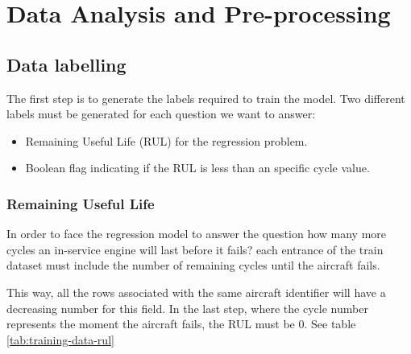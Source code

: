 
\chapter{Data Analysis and Pre-processing} %

\label{Chapter3}


\section{Data labelling}

The first step is to generate the labels required to train the model.
Two different labels must be generated for each question we want to answer:

\begin{itemize}
    \item Remaining Useful Life (RUL) for the regression problem.
    \item Boolean flag indicating if the RUL is less than an specific cycle value.
\end{itemize}

\subsection{Remaining Useful Life}

In order to face the regression model to answer the question how many more cycles an in-service engine will last before it fails? each entrance of the train dataset must include the number of remaining cycles until the aircraft fails.

This way, all the rows associated with the same aircraft identifier will have a decreasing number for this field. In the last step, where the cycle number represents the moment the aircraft fails, the RUL must be 0. See table \ref{tab:training-data-rul}


